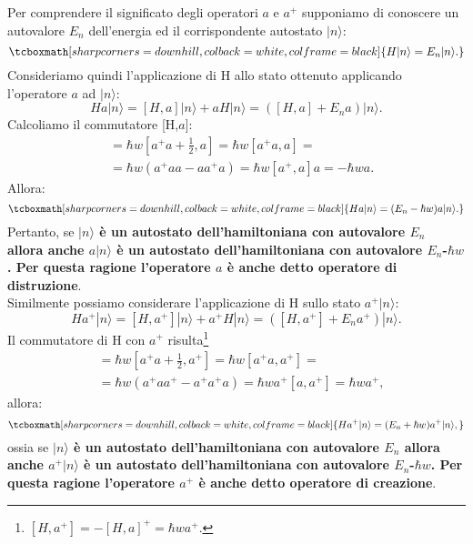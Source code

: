 \documentclass[a4paper,12pt,oneside]{book}
\begin{document}
Per comprendere il significato degli operatori $a$ e $a^+$ supponiamo di conoscere un autovalore $E_n$  dell'energia ed il corrispondente autostato $|n \rangle$:
	\begin{equation}
		\tcboxmath[sharp corners=downhill, colback=white, colframe=black]{		
			H|n\rangle=E_n|n\rangle.
			}
	\end{equation}
Consideriamo quindi l'applicazione di H allo stato ottenuto applicando l'operatore $a$ ad $|n\rangle$:
	\begin{equation}
		Ha|n\rangle= [H,a]|n \rangle+aH|n\rangle=([H,a]+E_na)|n\rangle.
	\end{equation}
Calcoliamo il commutatore [H,$a$]:
	\begin{align}
		[H,a]&=\hbar w[a^+a+\frac{1}{2},a]=\hbar w [a^+a,a]= \nonumber\\
		&=\hbar w (a^+aa-aa^+a)=\hbar w[a^+,a]a=-\hbar wa.
	\end{align}
Allora:
	\begin{equation}
		\tcboxmath[sharp corners=downhill, colback=white, colframe=black]{
		Ha|n\rangle=(E_n-\hbar w)a|n\rangle.
		}
	\end{equation}
Pertanto, se \textbf{$|n\rangle$ è un autostato dell'hamiltoniana con autovalore $E_n$ allora anche $a|n\rangle$ è  un autostato dell'hamiltoniana con autovalore $E_n$-$\hbar w$. Per questa ragione l'operatore $a$ è anche detto operatore di distruzione}.  \\

 Similmente possiamo considerare l'applicazione di H sullo stato $a^+|n\rangle$:
	\begin{equation}
		Ha^+|n\rangle= [H,a^+]|n\rangle+a^+H|n\rangle=([H,a^+]+E_na^+)|n\rangle.
	\end{equation}
Il commutatore di H con $a^+$ risulta\footnote{$[H,a^+]=-[H,a]^+=\hbar w a^+$.}
	\begin{align}
		[H,a^+]&= \hbar w[a^+a+\frac{1}{2},a^+]=\hbar w [a^+a,a^+]= \nonumber\\
		&= \hbar w (a^+aa^+-a^+a^+a)=\hbar w a^+ [a,a^+]=\hbar wa^+,
	\end{align}
allora:
	\begin{equation}
		\tcboxmath[sharp corners=downhill, colback=white, colframe=black]{
			Ha^+|n\rangle=(E_n+\hbar w)a^+|n\rangle,
			}
	\end{equation}
ossia se \textbf{$|n\rangle$ è un autostato dell'hamiltoniana con autovalore $E_n$ allora anche $a^+|n\rangle$ è  un autostato dell'hamiltoniana con autovalore $E_n$-$\hbar w$. Per questa ragione l'operatore $a^+$ è anche detto operatore di creazione}. \\ 
\end{document}
